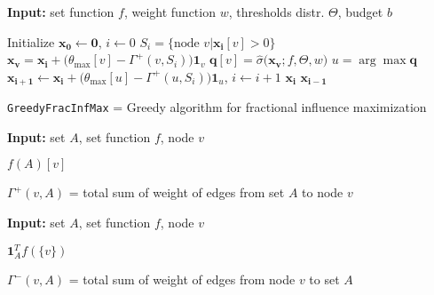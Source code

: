 \documentclass[11pt]{article}
\renewcommand{\algorithmicrequire}{\textbf{Input:}}  %
\begin{document}
\begin{algorithm}[H]
	\algorithmicrequire { set function $f$, weight function $w$, thresholds distr. $\Theta$, budget $b$}
	\begin{algorithmic}
		\State Initialize $\mathbf{x_0} \leftarrow \mathbf{0}$, $i\leftarrow 0$
		\State $S_i = \{\text{node } v | \mathbf{x_i}[v] > 0\}$
		\State $\mathbf{x_v} = \mathbf{x_i} + \Big( \theta_{\max}[v] - \Gamma^+(v,S_i)\Big) \mathbf{1}_{v}$
		\State $\mathbf{q}[v] = \hat\sigma\Big(\mathbf{x_v}; f, \Theta, w \Big)$
		\EndFor
		\State $u = \arg\max \mathbf{q}$
		\State $\mathbf{x_{i+1}} \leftarrow \mathbf{x_i} + \Big( \theta_{\max}[u] - \Gamma^+(u,S_i)\Big) \mathbf{1}_{u}$, $i\leftarrow i + 1$
		\EndWhile
		\State \Return $\mathbf{x_i}$
		\Else
		\State \Return $\mathbf{x_{i-1}}$
		\EndIf
	\end{algorithmic}
	\caption{\texttt{GreedyFracInfMax} = Greedy algorithm for fractional influence maximization} \label{alg:frac_greedy}
\end{algorithm}






\begin{algorithm}[H]
	\algorithmicrequire { set $A$, set function $f$, node $v$}
	\begin{algorithmic}
		\State \Return $f(A)[v]$
	\end{algorithmic}
	\caption{$\Gamma^+(v,A)$ = total sum of weight of edges from set $A$ to node $v$} \label{alg:gamma_plus}
\end{algorithm}

\begin{algorithm}[H]
	\algorithmicrequire { set $A$, set function $f$, node $v$}
	\begin{algorithmic}
		\State \Return $\mathbf{1}_A^T f(\{v\})$
	\end{algorithmic}
	\caption{$\Gamma^-(v,A)$ = total sum of weight of edges from node $v$ to set $A$} \label{alg:gamma_neg}
\end{algorithm}
\end{document}
